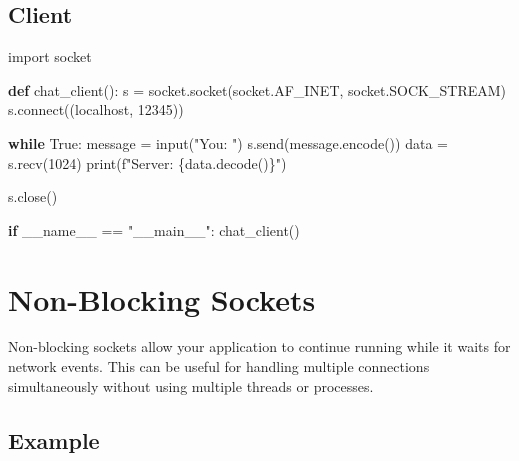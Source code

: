 \documentclass[
  letterpaper,
  DIV=11,
  numbers=noendperiod]{scrreprt}
\newenvironment{Shaded}{\begin{snugshade}}{\end{snugshade}}
\newcommand{\BuiltInTok}[1]{\textcolor[rgb]{0.00,0.23,0.31}{#1}}
\newcommand{\ControlFlowTok}[1]{\textcolor[rgb]{0.00,0.23,0.31}{\textbf{#1}}}
\newcommand{\DecValTok}[1]{\textcolor[rgb]{0.68,0.00,0.00}{#1}}
\newcommand{\ExtensionTok}[1]{\textcolor[rgb]{0.00,0.23,0.31}{#1}}
\newcommand{\ImportTok}[1]{\textcolor[rgb]{0.00,0.46,0.62}{#1}}
\newcommand{\KeywordTok}[1]{\textcolor[rgb]{0.00,0.23,0.31}{\textbf{#1}}}
\newcommand{\NormalTok}[1]{\textcolor[rgb]{0.00,0.23,0.31}{#1}}
\newcommand{\OperatorTok}[1]{\textcolor[rgb]{0.37,0.37,0.37}{#1}}
\newcommand{\SpecialCharTok}[1]{\textcolor[rgb]{0.37,0.37,0.37}{#1}}
\newcommand{\SpecialStringTok}[1]{\textcolor[rgb]{0.13,0.47,0.30}{#1}}
\newcommand{\StringTok}[1]{\textcolor[rgb]{0.13,0.47,0.30}{#1}}
\newcommand{\VariableTok}[1]{\textcolor[rgb]{0.07,0.07,0.07}{#1}}
\begin{document}
\subsection{Client}\label{client}

\begin{Shaded}
\begin{Highlighting}[]
\ImportTok{import}\NormalTok{ socket}

\KeywordTok{def}\NormalTok{ chat\_client():}
\NormalTok{    s }\OperatorTok{=}\NormalTok{ socket.socket(socket.AF\_INET, socket.SOCK\_STREAM)}
\NormalTok{    s.}\ExtensionTok{connect}\NormalTok{((}\StringTok{\textquotesingle{}localhost\textquotesingle{}}\NormalTok{, }\DecValTok{12345}\NormalTok{))}
    
    \ControlFlowTok{while} \VariableTok{True}\NormalTok{:}
\NormalTok{        message }\OperatorTok{=} \BuiltInTok{input}\NormalTok{(}\StringTok{"You: "}\NormalTok{)}
\NormalTok{        s.send(message.encode())}
\NormalTok{        data }\OperatorTok{=}\NormalTok{ s.recv(}\DecValTok{1024}\NormalTok{)}
        \BuiltInTok{print}\NormalTok{(}\SpecialStringTok{f"Server: }\SpecialCharTok{\{}\NormalTok{data}\SpecialCharTok{.}\NormalTok{decode()}\SpecialCharTok{\}}\SpecialStringTok{"}\NormalTok{)}
    
\NormalTok{    s.close()}

\ControlFlowTok{if} \VariableTok{\_\_name\_\_} \OperatorTok{==} \StringTok{"\_\_main\_\_"}\NormalTok{:}
\NormalTok{    chat\_client()}
\end{Highlighting}
\end{Shaded}

\section{Non-Blocking Sockets}\label{non-blocking-sockets}

Non-blocking sockets allow your application to continue running while it
waits for network events. This can be useful for handling multiple
connections simultaneously without using multiple threads or processes.

\subsection{Example}\label{example-57}
\end{document}
